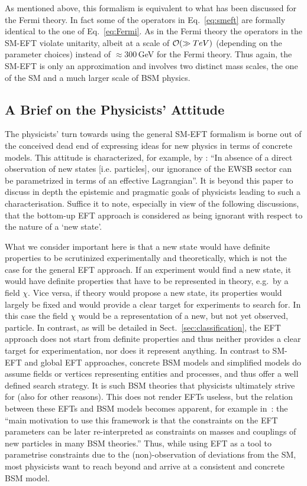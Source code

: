 As mentioned above, this formalism is equivalent to what has been discussed for the Fermi theory. 
In fact some of the operators in Eq.~\ref{eq:smeft} are formally identical to the one of Eq.~\ref{eq:Fermi}. 
As in the Fermi theory the operators in the SM-EFT violate
unitarity, albeit at a scale of ${\cal O}(\gg TeV)$ (depending on the
parameter choices) instead of $\approx
300$\,GeV for the Fermi theory. Thus again, the SM-EFT is only an approximation and
involves two distinct mass scales, the one of the SM and a much larger scale of BSM physics.


\subsection{A Brief on the Physicists' Attitude}
\label{sec:physrepres}

The physicists' turn towards using the general SM-EFT formalism is borne out of the conceived dead end of expressing ideas for new physics in terms of concrete models.
This attitude is characterized, for example, by \cite[p.~1]{Contino:2013kra}:
``In absence of a direct observation of new states [i.e.{} particles], our ignorance of the EWSB sector can be parametrized 
in terms of an effective Lagrangian''.
It is beyond this paper to discuss in depth the epistemic and pragmatic goals of physicists leading to such a characterisation.
Suffice it to note, especially in view of the following discussions, that the bottom-up EFT approach is considered as being ignorant with respect to the nature of a `new state'.

What we consider important here is that a new state would have
definite properties to be scrutinized experimentally and theoretically, which is not the case for the general EFT approach.
If an experiment would find a new state, it would have definite properties that have to be represented in theory, e.g.\ by a field $\chi $.
Vice versa, if theory would propose a new state, its properties would largely be fixed and
would provide a clear target for experiments to search for.
In this case the field $\chi $ would be a representation of a new, but
not yet observed, particle.
In contrast, as will be detailed in Sect.~\ref{sec:classification}, the EFT approach
does not start from definite properties and thus neither provides
a clear target for experimentation, nor does it represent anything.  
In contrast to SM-EFT and global EFT approaches, concrete BSM models and simplified models
do assume fields or vertices representing entities and processes, and thus offer a well defined search strategy. 
It is such BSM theories that physicists ultimately strive for (also for other reasons).
This does not render EFTs useless, but the relation between these EFTs and BSM models becomes
apparent, for example in~\cite[p.~305]{deFlorian:2016spz}: the
``main motivation to use this framework is that the constraints on the EFT parameters can be 
later re-interpreted as constraints on masses and couplings of new particles in many BSM theories.''
Thus, while using EFT as a tool to parametrise constraints due to the (non)-observation of deviations
from the SM, most physicists want to reach beyond and arrive at a consistent and concrete BSM model.
